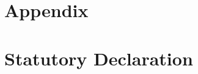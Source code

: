 \documentclass[11pt, a4paper]{article} %
\makeatletter
\theoremstyle{definition}
\newcommand{\signature}[2][5cm]{%
  \begin{tabular}{@{}p{#1}@{}}
    #2 \\[2\normalbaselineskip] \hrule \\[0pt]
    {\small \textit{Signature}} \\[2\normalbaselineskip] \hrule \\[0pt]
    {\small \textit{Place, Date}}
  \end{tabular}
}
\makeatother
\begin{document}
\newpage %
\section*{Appendix} %


\newpage %
\thispagestyle{empty} %
\section*{Statutory Declaration} %

\vspace*{1in} %





\end{document}
